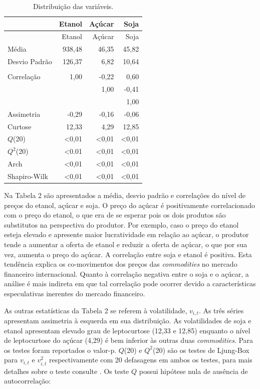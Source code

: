 \pagebreak

\begin{longtable}[]{@{}lrrr@{}}
\caption{Distribuição das variáveis.}\tabularnewline
\toprule
& Etanol & Açúcar & Soja\tabularnewline
\midrule
\endfirsthead
\toprule
& Etanol & Açúcar & Soja\tabularnewline
\midrule
\endhead
Média & 938,48 & 46,35 & 45,82\tabularnewline
Desvio Padrão & 126,37 & 6,82 & 10,64\tabularnewline
& & &\tabularnewline
Correlação & 1,00 & -0,22 & 0,60\tabularnewline
& & 1,00 & -0,41\tabularnewline
& & & 1,00\tabularnewline
Assimetria & -0,29 & -0,16 & -0,06\tabularnewline
Curtose & 12,33 & 4,29 & 12,85\tabularnewline
\(Q\)(20) & \textless{}0,01 & \textless{}0,01 &
\textless{}0,01\tabularnewline
\(Q^2\)(20) & \textless{}0.01 & \textless{}0,01 &
\textless{}0,01\tabularnewline
Arch & \textless{}0,01 & \textless{}0,01 &
\textless{}0,01\tabularnewline
Shapiro-Wilk & \textless{}0,01 & \textless{}0,01 &
\textless{}0,01\tabularnewline
\bottomrule
\end{longtable}

Na Tabela 2 são apresentados a média, desvio padrão e correlações do
nível de preços do etanol, açúcar e soja. O preço do açúcar é
positivamente correlacionado com o preço do etanol, o que era de se
esperar pois os dois produtos são substitutos na perspectiva do
produtor. Por exemplo, caso o preço do etanol esteja elevado e apresente
maior lucratividade em relação ao açúcar, o produtor tende a aumentar a
oferta de etanol e reduzir a oferta de açúcar, o que por sua vez,
aumenta o preço do açúcar. A correlação entre soja e etanol é positiva.
Esta tendência explica os co-movimentos dos preços das
\emph{commodities} no mercado financeiro internacional. Quanto à
correlação negativa entre o soja e o açúcar, a análise é mais indireta
em que tal correlação pode ocorrer devido a características especulativas
inerentes do mercado financeiro.

As outras estatísticas da Tabela 2 se referem à volatilidade,
\(v_{i,t}\). As três séries apresentam assimetria à esquerda em sua
distribuição. As volatilidades de soja e etanol apresentam elevado grau
de leptocurtose (12,33 e 12,85) enquanto o nível de leptocurtose do
açúcar (4,29) é bem inferior às outras duas \emph{commodities}. Para os
testes foram reportados o valor-p. \(Q\)(20) e \(Q^2\)(20) são os testes
de Ljung-Box para \(v_{i,t}\) e \(v_{i,t}^2\) respectivamente com 20
defasagens em ambos os testes, para mais detalhes sobre o teste consulte
. Os teste \(Q\) possui hipótese nula de ausência de
autocorrelação:

